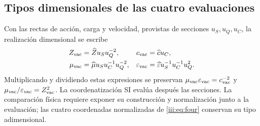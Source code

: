 \subsection{Tipos dimensionales de las cuatro evaluaciones}

Con las rectas de acción, carga y velocidad, provistas de secciones
$u_S,u_Q,u_C$, la realización dimensional se escribe
\begin{align}
 Z_{\rm vac}&=\widehat Z u_Su_Q^{-2},&
 c_{\rm vac}&=\widehat c u_C,\\
 \mu_{\rm vac}&=\widehat\mu u_Su_C^{-1}u_Q^{-2},&
 \varepsilon_{\rm vac}&=\widehat\varepsilon u_S^{-1}u_C^{-1}u_Q^2.
 \label{iii:eq:dimensions}
\end{align}
Multiplicando y dividiendo estas expresiones se preservan
$\mu_{\rm vac}\varepsilon_{\rm vac}=c_{\rm vac}^{-2}$ y
$\mu_{\rm vac}/\varepsilon_{\rm vac}=Z_{\rm vac}^2$.
La coordenatización SI evalúa después las secciones. La comparación física requiere
exponer su construcción y normalización junto a la evaluación; las cuatro
coordenadas normalizadas de \eqref{iii:eq:four} conservan su tipo adimensional.
